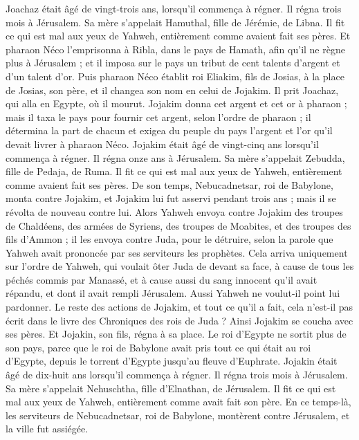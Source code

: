 \begin{multicols}{2}
Joachaz était âgé de vingt-trois ans, lorsqu’il commença à régner. Il régna trois mois à Jérusalem. Sa mère s’appelait Hamuthal, fille de Jérémie, de Libna.
Il fit ce qui est mal aux yeux de Yahweh, entièrement comme avaient fait ses pères.
Et pharaon Néco l’emprisonna à Ribla, dans le pays de Hamath, afin qu’il ne règne plus à Jérusalem ; et il imposa sur le pays un tribut de cent talents d’argent et d’un talent d’or.
Puis pharaon Néco établit roi Eliakim, fils de Josias, à la place de Josias, son père, et il changea son nom en celui de Jojakim. Il prit Joachaz, qui alla en Egypte, où il mourut.
Jojakim donna cet argent et cet or à pharaon ; mais il taxa le pays pour fournir cet argent, selon l’ordre de pharaon ; il détermina la part de chacun et exigea du peuple du pays l’argent et l’or qu’il devait livrer à pharaon Néco.
Jojakim était âgé de vingt-cinq ans lorsqu’il commença à régner. Il régna onze ans à Jérusalem. Sa mère s’appelait Zebudda, fille de Pedaja, de Ruma.
Il fit ce qui est mal aux yeux de Yahweh, entièrement comme avaient fait ses pères.
\VerseOne{}De son temps, Nebucadnetsar, roi de Babylone, monta contre Jojakim, et Jojakim lui fut asservi pendant trois ans ; mais il se révolta de nouveau contre lui.
Alors Yahweh envoya contre Jojakim des troupes de Chaldéens, des armées de Syriens, des troupes de Moabites, et des troupes des fils d’Ammon ; il les envoya contre Juda, pour le détruire, selon la parole que Yahweh avait prononcée par ses serviteurs les prophètes.
Cela arriva uniquement sur l’ordre de Yahweh, qui voulait ôter Juda de devant sa face, à cause de tous les péchés commis par Manassé,
et à cause aussi du sang innocent qu’il avait répandu, et dont il avait rempli Jérusalem. Aussi Yahweh ne voulut-il point lui pardonner.
Le reste des actions de Jojakim, et tout ce qu’il a fait, cela n’est-il pas écrit dans le livre des Chroniques des rois de Juda ?
Ainsi Jojakim se coucha avec ses pères. Et Jojakin, son fils, régna à sa place.
Le roi d’Egypte ne sortit plus de son pays, parce que le roi de Babylone avait pris tout ce qui était au roi d’Egypte, depuis le torrent d’Egypte jusqu’au fleuve d’Euphrate.
Jojakin était âgé de dix-huit ans lorsqu’il commença à régner. Il régna trois mois à Jérusalem. Sa mère s’appelait Nehuschtha, fille d’Elnathan, de Jérusalem.
Il fit ce qui est mal aux yeux de Yahweh, entièrement comme avait fait son père.
En ce temps-là, les serviteurs de Nebucadnetsar, roi de Babylone, montèrent contre Jérusalem, et la ville fut assiégée.

\end{multicols}
